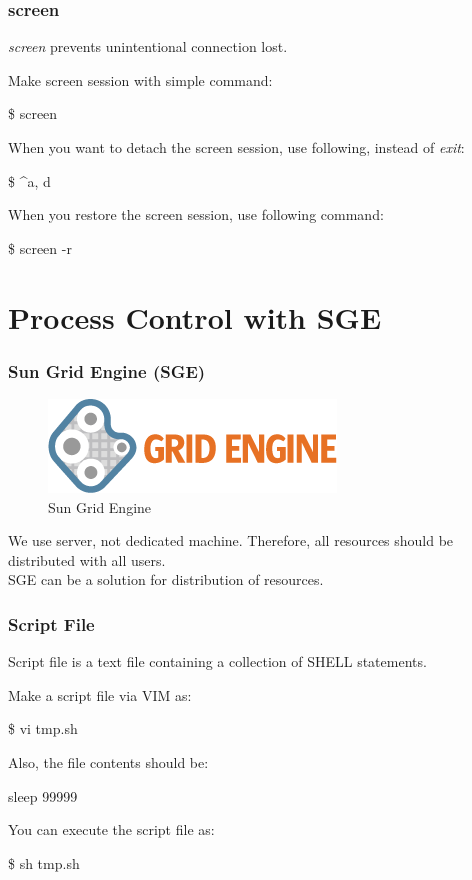 \documentclass{beamer}
\begin{document}
	\begin{frame}
		\frametitle{screen}
		\textit{screen} prevents unintentional connection lost. 
		
		Make screen session with simple command:
		\begin{example}
			\$ screen
		\end{example}
	
		When you want to detach the screen session, use following, instead of \textit{exit}:
		\begin{example}
			\$ \^{}a, d
		\end{example}
	
		When you restore the screen session, use following command:
		\begin{example}
			\$ screen -r
		\end{example}
	\end{frame}
	
	\section{Process Control with SGE}
	
	\begin{frame}
		\frametitle{Sun Grid Engine (SGE)}
		
		\begin{figure}[h!]
			\centering
			\includegraphics[width=0.5 \linewidth]{figures/SGE.png}
			\caption{Sun Grid Engine}
		\end{figure}
		
		We use server, not dedicated machine. Therefore, all resources should be distributed with all users. \\
		SGE can be a solution for distribution of resources. 
	\end{frame}

	\begin{frame}
		\frametitle{Script File}
		Script file is a text file containing a collection of SHELL statements. 
		
		Make a script file via VIM as:
		\begin{example}
			\$ vi tmp.sh
		\end{example}
	
		Also, the file contents should be:
		\begin{example}
			sleep 99999
		\end{example}
	
		You can execute the script file as:
		\begin{example}
			\$ sh tmp.sh
		\end{example}
	\end{frame}
\end{document}
